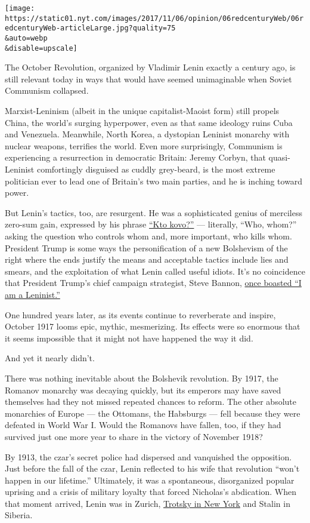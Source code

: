 \texttt{[image: https://static01.nyt.com/images/2017/11/06/opinion/06redcenturyWeb/06redcenturyWeb-articleLarge.jpg?quality=75\\\&auto=webp\\\&disable=upscale]}

The October Revolution, organized by Vladimir Lenin exactly a century
ago, is still relevant today in ways that would have seemed unimaginable
when Soviet Communism collapsed.

Marxist-Leninism (albeit in the unique capitalist-Maoist form) still
propels China, the world's surging hyperpower, even as that same
ideology ruins Cuba and Venezuela. Meanwhile, North Korea, a dystopian
Leninist monarchy with nuclear weapons, terrifies the world. Even more
surprisingly, Communism is experiencing a resurrection in democratic
Britain: Jeremy Corbyn, that quasi-Leninist comfortingly disguised as
cuddly grey-beard, is the most extreme politician ever to lead one of
Britain's two main parties, and he is inching toward power.

But Lenin's tactics, too, are resurgent. He was a sophisticated genius
of merciless zero-sum gain, expressed by his phrase
\href{https://en.wikipedia.org/wiki/Who,_whom\%3F}{``Kto kovo?''} ---
literally, ``Who, whom?'' asking the question who controls whom and,
more important, who kills whom. President Trump is some ways the
personification of a new Bolshevism of the right where the ends justify
the means and acceptable tactics include lies and smears, and the
exploitation of what Lenin called useful idiots. It's no coincidence
that President Trump's chief campaign strategist, Steve Bannon,
\href{https://www.thedailybeast.com/steve-bannon-trumps-top-guy-told-me-he-was-a-leninist}{once
boasted ``I am a Leninist.''}

One hundred years later, as its events continue to reverberate and
inspire, October 1917 looms epic, mythic, mesmerizing. Its effects were
so enormous that it seems impossible that it might not have happened the
way it did.

And yet it nearly didn't.

There was nothing inevitable about the Bolshevik revolution. By 1917,
the Romanov monarchy was decaying quickly, but its emperors may have
saved themselves had they not missed repeated chances to reform. The
other absolute monarchies of Europe --- the Ottomans, the Habsburgs ---
fell because they were defeated in World War I. Would the Romanovs have
fallen, too, if they had survived just one more year to share in the
victory of November 1918?

By 1913, the czar's secret police had dispersed and vanquished the
opposition. Just before the fall of the czar, Lenin reflected to his
wife that revolution ``won't happen in our lifetime.'' Ultimately, it
was a spontaneous, disorganized popular uprising and a crisis of
military loyalty that forced Nicholas's abdication. When that moment
arrived, Lenin was in Zurich,
\href{https://www.jacobinmag.com/2016/10/trotsky-new-york-socialist-party-debs-revolution/}{Trotsky
in New York} and Stalin in Siberia.

